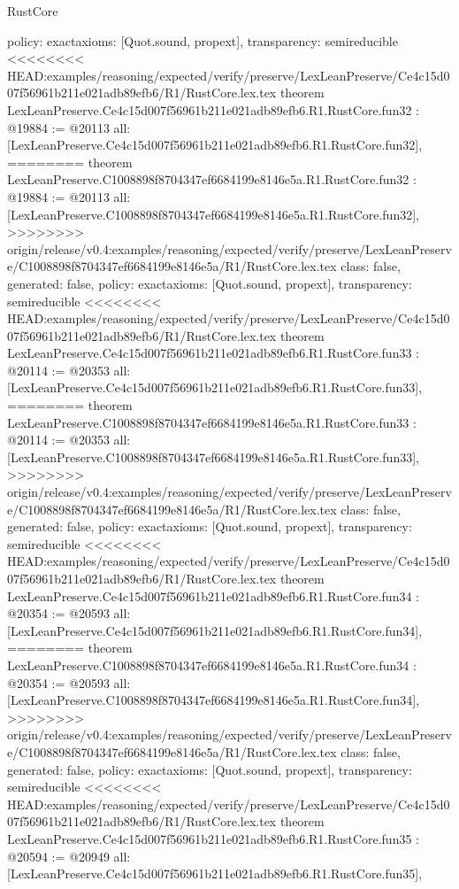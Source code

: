 \begin{lexlean}{RustCore}
\begin{coremodule}
{\begin{coremodule}
{{{{{{{{{{{{{{{{{{{{{{{{{{{{{{{{{{{  policy: exact{axioms: [Quot.sound, propext]},
  transparency: semireducible
}
<<<<<<<< HEAD:examples/reasoning/expected/verify/preserve/LexLeanPreserve/Ce4c15d007f56961b211e021adb89efb6/R1/RustCore.lex.tex
theorem LexLeanPreserve.Ce4c15d007f56961b211e021adb89efb6.R1.RustCore.fun32 : @19884 := @20113 {
  all: [LexLeanPreserve.Ce4c15d007f56961b211e021adb89efb6.R1.RustCore.fun32],
========
theorem LexLeanPreserve.C1008898f8704347ef6684199e8146e5a.R1.RustCore.fun32 : @19884 := @20113 {
  all: [LexLeanPreserve.C1008898f8704347ef6684199e8146e5a.R1.RustCore.fun32],
>>>>>>>> origin/release/v0.4:examples/reasoning/expected/verify/preserve/LexLeanPreserve/C1008898f8704347ef6684199e8146e5a/R1/RustCore.lex.tex
  class: false,
  generated: false,
  policy: exact{axioms: [Quot.sound, propext]},
  transparency: semireducible
}
<<<<<<<< HEAD:examples/reasoning/expected/verify/preserve/LexLeanPreserve/Ce4c15d007f56961b211e021adb89efb6/R1/RustCore.lex.tex
theorem LexLeanPreserve.Ce4c15d007f56961b211e021adb89efb6.R1.RustCore.fun33 : @20114 := @20353 {
  all: [LexLeanPreserve.Ce4c15d007f56961b211e021adb89efb6.R1.RustCore.fun33],
========
theorem LexLeanPreserve.C1008898f8704347ef6684199e8146e5a.R1.RustCore.fun33 : @20114 := @20353 {
  all: [LexLeanPreserve.C1008898f8704347ef6684199e8146e5a.R1.RustCore.fun33],
>>>>>>>> origin/release/v0.4:examples/reasoning/expected/verify/preserve/LexLeanPreserve/C1008898f8704347ef6684199e8146e5a/R1/RustCore.lex.tex
  class: false,
  generated: false,
  policy: exact{axioms: [Quot.sound, propext]},
  transparency: semireducible
}
<<<<<<<< HEAD:examples/reasoning/expected/verify/preserve/LexLeanPreserve/Ce4c15d007f56961b211e021adb89efb6/R1/RustCore.lex.tex
theorem LexLeanPreserve.Ce4c15d007f56961b211e021adb89efb6.R1.RustCore.fun34 : @20354 := @20593 {
  all: [LexLeanPreserve.Ce4c15d007f56961b211e021adb89efb6.R1.RustCore.fun34],
========
theorem LexLeanPreserve.C1008898f8704347ef6684199e8146e5a.R1.RustCore.fun34 : @20354 := @20593 {
  all: [LexLeanPreserve.C1008898f8704347ef6684199e8146e5a.R1.RustCore.fun34],
>>>>>>>> origin/release/v0.4:examples/reasoning/expected/verify/preserve/LexLeanPreserve/C1008898f8704347ef6684199e8146e5a/R1/RustCore.lex.tex
  class: false,
  generated: false,
  policy: exact{axioms: [Quot.sound, propext]},
  transparency: semireducible
}
<<<<<<<< HEAD:examples/reasoning/expected/verify/preserve/LexLeanPreserve/Ce4c15d007f56961b211e021adb89efb6/R1/RustCore.lex.tex
theorem LexLeanPreserve.Ce4c15d007f56961b211e021adb89efb6.R1.RustCore.fun35 : @20594 := @20949 {
  all: [LexLeanPreserve.Ce4c15d007f56961b211e021adb89efb6.R1.RustCore.fun35],
}}}}}}}}}}}}}}}}}}}}}}}}}}}}}}}}}}}}}}
\end{coremodule}}
\end{coremodule}
\end{lexlean}
